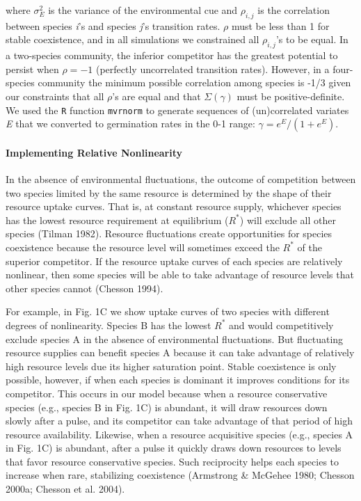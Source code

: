 \documentclass[12pt,]{article}
\let\oldparagraph\paragraph
\renewcommand{\paragraph}[1]{\oldparagraph{#1}\mbox{}}
\begin{document}
\noindent where \(\sigma^2_{E}\) is the variance of the environmental
cue and \(\rho_{i,j}\) is the correlation between species \emph{i}'s and
species \emph{j}'s transition rates. \(\rho\) must be less than 1 for
stable coexistence, and in all simulations we constrained all
\(\rho_{i,j}\)'s to be equal. In a two-species community, the inferior
competitor has the greatest potential to persist when \(\rho=-1\)
(perfectly uncorrelated transition rates). However, in a four-species
community the minimum possible correlation among species is -1/3 given
our constraints that all \(\rho\)'s are equal and that
\(\Sigma(\gamma)\) must be positive-definite. We used the \texttt{R}
function \texttt{mvrnorm} to generate sequences of (un)correlated
variates \emph{E} that we converted to germination rates in the 0-1
range: \(\gamma = e^E / \left(1 + e^E \right)\).

\paragraph{Implementing Relative
Nonlinearity}\label{implementing-relative-nonlinearity}

In the absence of environmental fluctuations, the outcome of competition
between two species limited by the same resource is determined by the
shape of their resource uptake curves. That is, at constant resource
supply, whichever species has the lowest resource requirement at
equilibrium (\(R^*\)) will exclude all other species (Tilman 1982).
Resource fluctuations create opportunities for species coexistence
because the resource level will sometimes exceed the \(R^*\) of the
superior competitor. If the resource uptake curves of each species are
relatively nonlinear, then some species will be able to take advantage
of resource levels that other species cannot (Chesson 1994).

For example, in Fig. 1C we show uptake curves of two species with
different degrees of nonlinearity. Species B has the lowest \(R^*\) and
would competitively exclude species A in the absence of environmental
fluctuations. But fluctuating resource supplies can benefit species A
because it can take advantage of relatively high resource levels due its
higher saturation point. Stable coexistence is only possible, however,
if when each species is dominant it improves conditions for its
competitor. This occurs in our model because when a resource
conservative species (e.g., species B in Fig. 1C) is abundant, it will
draw resources down slowly after a pulse, and its competitor can take
advantage of that period of high resource availability. Likewise, when a
resource acquisitive species (e.g., species A in Fig. 1C) is abundant,
after a pulse it quickly draws down resources to levels that favor
resource conservative species. Such reciprocity helps each species to
increase when rare, stabilizing coexistence (Armstrong \& McGehee 1980;
Chesson 2000a; Chesson et al. 2004).
\end{document}
